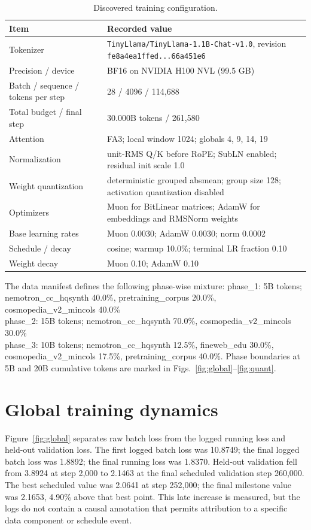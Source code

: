 \documentclass[10pt]{article}
\begin{document}
\begin{table}[H]\centering
\caption{Discovered training configuration.}\label{tab:setup}
\begin{tabular}{ll}\toprule
Item & Recorded value \\\midrule
Tokenizer & \texttt{TinyLlama/TinyLlama-1.1B-Chat-v1.0}, revision \texttt{fe8a4ea1ffed...66a451e6} \\
Precision / device & BF16 on NVIDIA H100 NVL (99.5 GB) \\
Batch / sequence / tokens per step & 28 / 4096 / 114,688 \\
Total budget / final step & 30.000B tokens / 261,580 \\
Attention & FA3; local window 1024; globals 4, 9, 14, 19 \\
Normalization & unit-RMS Q/K before RoPE; SubLN enabled; residual init scale 1.0 \\
Weight quantization & deterministic grouped absmean; group size 128; activation quantization disabled \\
Optimizers & Muon for BitLinear matrices; AdamW for embeddings and RMSNorm weights \\
Base learning rates & Muon 0.0030; AdamW 0.0030; norm 0.0002 \\
Schedule / decay & cosine; warmup 10.0\%; terminal LR fraction 0.10 \\
Weight decay & Muon 0.10; AdamW 0.10 \\
\bottomrule\end{tabular}
\end{table}

The data manifest defines the following phase-wise mixture: phase\_1: 5B tokens; nemotron\_cc\_hqsynth 40.0\%, pretraining\_corpus 20.0\%, cosmopedia\_v2\_mincols 40.0\%\\ phase\_2: 15B tokens; nemotron\_cc\_hqsynth 70.0\%, cosmopedia\_v2\_mincols 30.0\%\\ phase\_3: 10B tokens; nemotron\_cc\_hqsynth 12.5\%, fineweb\_edu 30.0\%, cosmopedia\_v2\_mincols 17.5\%, pretraining\_corpus 40.0\%. Phase boundaries at 5B and 20B cumulative tokens are marked in Figs.~\ref{fig:global}--\ref{fig:quant}.

\section{Global training dynamics}
Figure~\ref{fig:global} separates raw batch loss from the logged running loss and held-out validation loss. The first logged batch loss was 10.8749; the final logged batch loss was 1.8892; the final running loss was 1.8370. Held-out validation fell from 3.8924 at step 2,000 to 2.1463 at the final scheduled validation step 260,000. The best scheduled value was 2.0641 at step 252,000; the final milestone value was 2.1653, 4.90\% above that best point. This late increase is measured, but the logs do not contain a causal annotation that permits attribution to a specific data component or schedule event.
\end{document}
